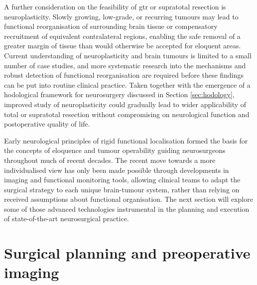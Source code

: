 \documentclass[12pt,phd,a4paper,twoside]{ucl_thesis}
\begin{document}
A further consideration on the feasibility of \gls{gtr} or supratotal resection is neuroplasticity\autocite{Duffau2005}.
Slowly growing, low-grade, or recurring tumours may lead to functional reorganisation of surrounding brain tissue\autocite{Takahashi2012,Southwell2016,Das2019} or compensatory recruitment of equivalent contralateral regions\autocite{Mitolo2022}, enabling the safe removal of a greater margin of tissue than would otherwise be accepted for eloquent areas\autocite{Rossi2019a}.
Current understanding of neuroplasticity and brain tumours is limited to a small number of case studies, and more systematic research into the mechanisms and robust detection of functional reorganisation are required before these findings can be put into routine clinical practice\autocite{Duffau2005,Abel2015,Satoer2017}.
Taken together with the emergence of a hodological framework for neurosurgery discussed in Section \ref{sec:hodology}\autocite{Sala2019}, improved study of neuroplasticity could gradually lead to wider applicability of total or supratotal resection without compromising on neurological function and postoperative quality of life.

Early neurological principles of rigid functional localisation formed the basis for the concepts of eloquence and tumour operability guiding neurosurgeons throughout much of recent decades.
The recent move towards a more individualised view has only been made possible through developments in imaging and functional monitoring tools, allowing clinical teams to adapt the surgical strategy to each unique brain-tumour system, rather than relying on received assumptions about functional organisation\autocite{Boerger2023}.
The next section will explore some of those advanced technologies instrumental in the planning and execution of state-of-the-art neurosurgical practice.



\section{Surgical planning and preoperative imaging}
\end{document}
